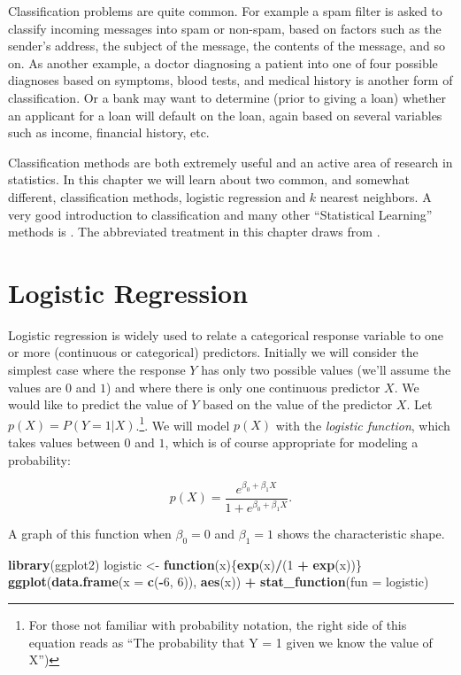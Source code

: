 \documentclass[
]{krantz}
\newenvironment{Shaded}{\begin{snugshade}}{\end{snugshade}}
\newcommand{\ControlFlowTok}[1]{\textcolor[rgb]{0.13,0.29,0.53}{\textbf{#1}}}
\newcommand{\DataTypeTok}[1]{\textcolor[rgb]{0.13,0.29,0.53}{#1}}
\newcommand{\DecValTok}[1]{\textcolor[rgb]{0.00,0.00,0.81}{#1}}
\newcommand{\KeywordTok}[1]{\textcolor[rgb]{0.13,0.29,0.53}{\textbf{#1}}}
\newcommand{\NormalTok}[1]{#1}
\newcommand{\OperatorTok}[1]{\textcolor[rgb]{0.81,0.36,0.00}{\textbf{#1}}}
\newcommand{\StringTok}[1]{\textcolor[rgb]{0.31,0.60,0.02}{#1}}
\begin{document}
Classification problems are quite common. For example a spam filter is asked to classify incoming messages into spam or non-spam, based on factors such as the sender's address, the subject of the message, the contents of the message, and so on. As another example, a doctor diagnosing a patient into one of four possible diagnoses based on symptoms, blood tests, and medical history is another form of classification. Or a bank may want to determine (prior to giving a loan) whether an applicant for a loan will default on the loan, again based on several variables such as income, financial history, etc.

Classification methods are both extremely useful and an active area of research in statistics. In this chapter we will learn about two common, and somewhat different, classification methods, logistic regression and \(k\) nearest neighbors. A very good introduction to classification and many other ``Statistical Learning'' methods is \citet{JamesEtAl}. The abbreviated treatment in this chapter draws from \citet{JamesEtAl}.

\hypertarget{logistic-regression}{%
\section{Logistic Regression}\label{logistic-regression}}

Logistic regression is widely used to relate a categorical response variable to one or more (continuous or categorical) predictors. Initially we will consider the simplest case where the response \(Y\) has only two possible values (we'll assume the values are \(0\) and \(1\)) and where there is only one continuous predictor \(X\). We would like to predict the value of \(Y\) based on the value of the predictor \(X\). Let \(p(X) = P(Y = 1 | X)\).\footnote{For those not familiar with probability notation, the right side of this equation reads as ``The probability that Y = 1 given we know the value of X'')}. We will model \(p(X)\) with the \emph{logistic function}, which takes values between \(0\) and \(1\), which is of course appropriate for modeling a probability:

\[
p(X) = \frac{e^{\beta_0 + \beta_1 X}}{1 + e^{\beta_0 + \beta_1 X}}.
\]

A graph of this function when \(\beta_0=0\) and \(\beta_1 = 1\) shows the characteristic shape.

\begin{Shaded}
\begin{Highlighting}[]
\KeywordTok{library}\NormalTok{(ggplot2)}
\NormalTok{logistic \textless{}{-}}\StringTok{ }\ControlFlowTok{function}\NormalTok{(x)\{}\KeywordTok{exp}\NormalTok{(x)}\OperatorTok{/}\NormalTok{(}\DecValTok{1} \OperatorTok{+}\StringTok{ }\KeywordTok{exp}\NormalTok{(x))\}}
\KeywordTok{ggplot}\NormalTok{(}\KeywordTok{data.frame}\NormalTok{(}\DataTypeTok{x =} \KeywordTok{c}\NormalTok{(}\OperatorTok{{-}}\DecValTok{6}\NormalTok{, }\DecValTok{6}\NormalTok{)), }\KeywordTok{aes}\NormalTok{(x)) }\OperatorTok{+}
\StringTok{  }\KeywordTok{stat\_function}\NormalTok{(}\DataTypeTok{fun =}\NormalTok{ logistic)}
\end{Highlighting}
\end{Shaded}
\end{document}

